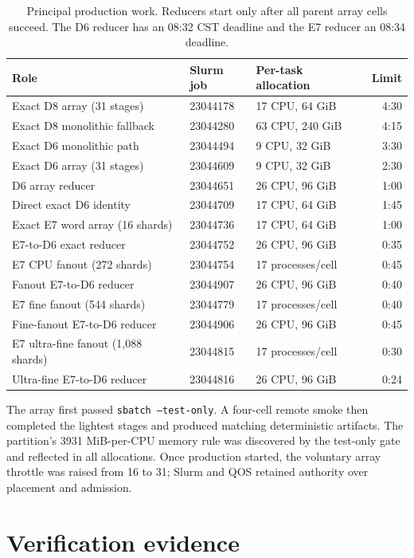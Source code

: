 \documentclass[10pt]{article}
\begin{document}
\begin{table}[h]
\centering
\begin{tabular}{@{}lllr@{}}
\toprule
Role & Slurm job & Per-task allocation & Limit \\
\midrule
Exact D8 array (31 stages) & 23044178 & 17 CPU, 64 GiB & 4:30 \\
Exact D8 monolithic fallback & 23044280 & 63 CPU, 240 GiB & 4:15 \\
Exact D6 monolithic path & 23044494 & 9 CPU, 32 GiB & 3:30 \\
Exact D6 array (31 stages) & 23044609 & 9 CPU, 32 GiB & 2:30 \\
D6 array reducer & 23044651 & 26 CPU, 96 GiB & 1:00 \\
Direct exact D6 identity & 23044709 & 17 CPU, 64 GiB & 1:45 \\
Exact E7 word array (16 shards) & 23044736 & 17 CPU, 64 GiB & 1:00 \\
E7-to-D6 exact reducer & 23044752 & 26 CPU, 96 GiB & 0:35 \\
E7 CPU fanout (272 shards) & 23044754 & 17 processes/cell & 0:45 \\
Fanout E7-to-D6 reducer & 23044907 & 26 CPU, 96 GiB & 0:40 \\
E7 fine fanout (544 shards) & 23044779 & 17 processes/cell & 0:40 \\
Fine-fanout E7-to-D6 reducer & 23044906 & 26 CPU, 96 GiB & 0:45 \\
E7 ultra-fine fanout (1,088 shards) & 23044815 & 17 processes/cell & 0:30 \\
Ultra-fine E7-to-D6 reducer & 23044816 & 26 CPU, 96 GiB & 0:24 \\
\bottomrule
\end{tabular}
\caption{Principal production work.  Reducers start only after all parent
array cells succeed.  The D6 reducer has an 08:32 CST deadline and the E7
reducer an 08:34 deadline.}
\end{table}

The array first passed \texttt{sbatch --test-only}.  A four-cell remote smoke
then completed the lightest stages and produced matching deterministic
artifacts.  The partition's 3931 MiB-per-CPU memory rule was discovered by the
test-only gate and reflected in all allocations.  Once production started,
the voluntary array throttle was raised from 16 to 31; Slurm and QOS retained
authority over placement and admission.

\section{Verification evidence}
\end{document}
